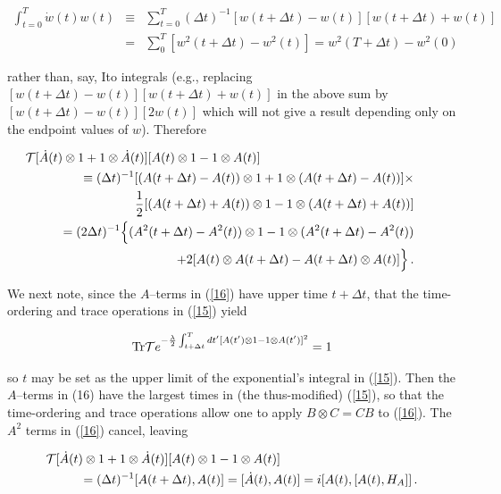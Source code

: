 \documentclass{article}
\begin{document}
\begin{eqnarray*}
\int_{t=0}^{T}\dot{w}(t)w(t)&\equiv&
\sum_{t=0}^{T}(\Delta t)^{-1}[w(t+\Delta t)-w(t)][w(t+\Delta t)+w(t)]\\
&=&\sum_{0}^{T}[w^{2}(t+\Delta t)-w^{2}(t)]= w^{2}(T+\Delta t)-w^{2}(0)	
\end{eqnarray*}
	
\noindent rather than, say, Ito integrals (e.g., replacing $[w(t+\Delta t)-w(t)][w(t+\Delta t)+w(t)]$ 
in the above sum by $[w(t+\Delta t)-w(t)][2w(t)]$ which will not give 
a result depending only on the endpoint values of $w$). Therefore{\hfill} 
\break

\begin{eqnarray}\label{16}
\lefteqn{\!\!\!\!\!\!\!\!\!\!\!\!{\cal T}[\dot{A}(t)\otimes 1+1\otimes \dot{A}(t)][A(t)\otimes 1-1\otimes A(t)]
\nonumber}\\
&&\equiv(\Delta t)^{-1}[(A(t+\Delta t)-A(t))
\otimes 1+1\otimes(A(t+\Delta t)-A(t))]\times\nonumber\\ 
&&\qquad\qquad\frac{1}{2}[(A(t+\Delta t)+A(t))\otimes 1-
1\otimes (A(t+\Delta t)+A(t))]\nonumber\\
&&=(2\Delta t)^{-1}\Bigl\{ (A^{2}(t+\Delta t)-A^{2}(t))\otimes 1
-1\otimes(A^{2}(t+\Delta t)-A^{2}(t))\nonumber\\
&&\qquad\qquad+2[A(t)\otimes A(t+\Delta t)-A(t+\Delta t)\otimes A(t)]\Bigr\}\, .
\end{eqnarray}

\noindent We next note, since  the $A$--terms in (\ref{16}) have upper 
time $t+\Delta t$, that the time-ordering and trace operations in (\ref{15}) yield  

\begin{eqnarray*}
{\rm Tr}{\cal T}e^{-\frac{\lambda}{2}\int_{t+\Delta t}^{T}dt'
[A(t')\otimes 1-1\otimes A(t')]^{2}}=1
\end{eqnarray*}

\noindent  so $t$ may be set as the 
upper limit of the exponential's integral in (\ref{15}).   
Then the $A$--terms in (16) have the largest times in (the thus-modified) (\ref{15}), so that 
the time-ordering and trace operations allow one to apply $B\otimes C=CB$ to 
(\ref{16}). The $A^{2}$ terms in (\ref{16}) cancel, leaving 

\begin{eqnarray}\label{17}
\lefteqn{{\cal T}[\dot{A}(t)\otimes 1+1\otimes \dot{A}(t)][A(t)\otimes 1-1\otimes A(t)]}\nonumber\\ 
&&\qquad=(\Delta t)^{-1}[A(t+\Delta t),A(t)]= [\dot{A}(t),A(t)]=i[A(t),[A(t),H_{A}]]\, .
\end{eqnarray}
\end{document}
